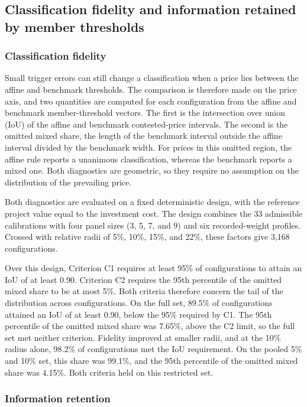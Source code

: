 \subsection{Classification fidelity and information retained by member thresholds}

\subsubsection{Classification fidelity}

Small trigger errors can still change a classification when a price lies between the affine and benchmark thresholds. The comparison is therefore made on the price axis, and two quantities are computed for each configuration from the affine and benchmark member-threshold vectors. The first is the intersection over union (IoU) of the affine and benchmark contested-price intervals. The second is the omitted mixed share, the length of the benchmark interval outside the affine interval divided by the benchmark width. For prices in this omitted region, the affine rule reports a unanimous classification, whereas the benchmark reports a mixed one. Both diagnostics are geometric, so they require no assumption on the distribution of the prevailing price.

Both diagnostics are evaluated on a fixed deterministic design, with the reference project value equal to the investment cost. The design combines the 33 admissible calibrations with four panel sizes (3, 5, 7, and 9) and six recorded-weight profiles. Crossed with relative radii of 5\%, 10\%, 15\%, and 22\%, these factors give 3,168 configurations.

Over this design, Criterion C1 requires at least 95\% of configurations to attain an IoU of at least 0.90. Criterion C2 requires the 95th percentile of the omitted mixed share to be at most 5\%. Both criteria therefore concern the tail of the distribution across configurations. On the full set, 89.5\% of configurations attained an IoU of at least 0.90, below the 95\% required by C1. The 95th percentile of the omitted mixed share was 7.65\%, above the C2 limit, so the full set met neither criterion. Fidelity improved at smaller radii, and at the 10\% radius alone, 98.2\% of configurations met the IoU requirement. On the pooled 5\% and 10\% set, this share was 99.1\%, and the 95th percentile of the omitted mixed share was 4.15\%. Both criteria held on this restricted set.

\subsubsection{Information retention}

